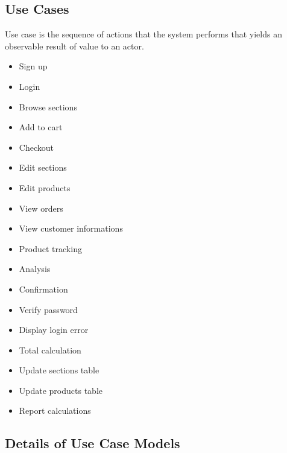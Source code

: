 \subsection{Use Cases}
Use case is the sequence of actions that the system performs that yields an
observable result of value to an actor.
\begin{itemize}
  \item Sign up
  \item Login
    \item Browse sections
  \item Add to cart
    \item Checkout
  \item Edit sections
    \item Edit products
    \item View orders
    \item View customer informations
    \item Product tracking
    \item Analysis
    \item Confirmation
    \item Verify password
    \item Display login error
    \item Total calculation
    \item Update sections table
    \item Update products table
    \item Report calculations
 
\end{itemize}


\newpage
\subsection{Details of Use Case Models}

